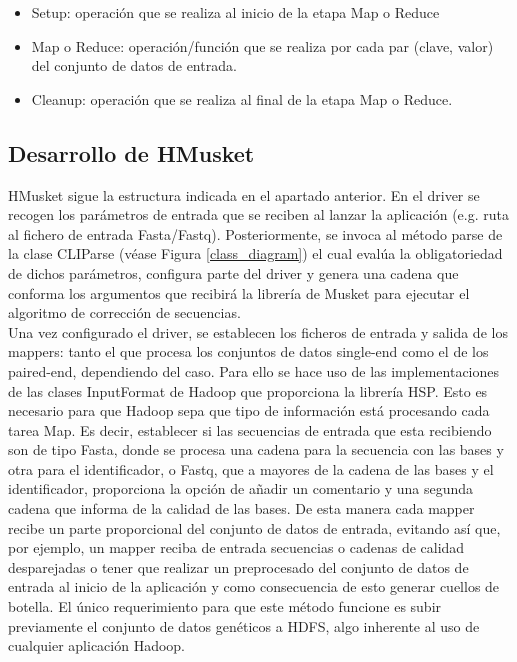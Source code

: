 \documentclass[conference]{IEEEtran}
\begin{document}
\begin{itemize}
	\item Setup: operación que se realiza al inicio de la etapa Map o Reduce
	\item Map o Reduce: operación/función que se realiza por cada par (clave, valor) del conjunto de datos de entrada.
	\item Cleanup: operación que se realiza al final de la etapa Map o Reduce.
\end{itemize}

\subsection{Desarrollo de HMusket}
HMusket sigue la estructura indicada en el apartado anterior. En el driver se recogen los parámetros de entrada que se reciben al lanzar la aplicación (e.g. ruta al fichero de entrada Fasta/Fastq). Posteriormente, se invoca al método parse de la clase CLIParse (véase Figura \ref{class_diagram}) el cual evalúa la obligatoriedad de dichos parámetros, configura parte del driver y genera una cadena que conforma los argumentos que recibirá la librería de Musket para ejecutar el algoritmo de corrección de secuencias.\\
Una vez configurado el driver, se establecen los ficheros de entrada y salida de los mappers: tanto el que procesa los conjuntos de datos single-end como el de los paired-end, dependiendo del caso. Para ello se hace uso de las implementaciones de las clases InputFormat de Hadoop que proporciona la librería HSP. Esto es necesario para que Hadoop sepa que tipo de información está procesando cada tarea Map. Es decir, establecer si las secuencias de entrada que esta recibiendo son de tipo Fasta, donde se procesa una cadena para la secuencia con las bases y otra para el identificador, o Fastq, que a mayores de la cadena de las bases y el identificador, proporciona la opción de añadir un comentario y una segunda cadena que informa de la calidad de las bases. De esta manera cada mapper recibe un parte proporcional del conjunto de datos de entrada, evitando así que, por ejemplo, un mapper reciba de entrada secuencias o cadenas de calidad desparejadas o tener que realizar un preprocesado del conjunto de datos de entrada al inicio de la aplicación y como consecuencia de esto generar cuellos de botella. El único requerimiento para que este método funcione es subir previamente el conjunto de datos genéticos a HDFS, algo inherente al uso de cualquier aplicación Hadoop.\\
\end{document}
